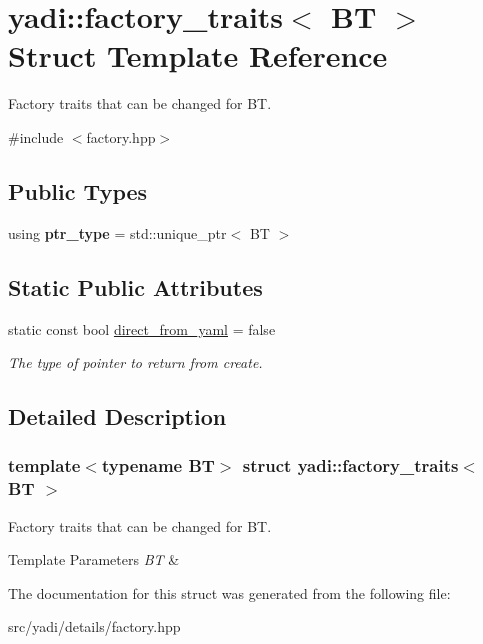 \hypertarget{structyadi_1_1factory__traits}{}\section{yadi\+:\+:factory\+\_\+traits$<$ BT $>$ Struct Template Reference}
\label{structyadi_1_1factory__traits}


Factory traits that can be changed for BT.  




{\ttfamily \#include $<$factory.\+hpp$>$}

\subsection*{Public Types}
\begin{DoxyCompactItemize}
\item 
\mbox{\label{structyadi_1_1factory__traits_a9a3b539941324b3aef58464863c76b55}} 
using {\bfseries ptr\+\_\+type} = std\+::unique\+\_\+ptr$<$ BT $>$
\end{DoxyCompactItemize}
\subsection*{Static Public Attributes}
\begin{DoxyCompactItemize}
\item 
\mbox{\label{structyadi_1_1factory__traits_af63ff1e85feaa7a1215130ac4d63e308}} 
static const bool \hyperlink{structyadi_1_1factory__traits_af63ff1e85feaa7a1215130ac4d63e308}{direct\+\_\+from\+\_\+yaml} = false
\begin{DoxyCompactList}\small\item\em The type of pointer to return from create. \end{DoxyCompactList}\end{DoxyCompactItemize}


\subsection{Detailed Description}
\subsubsection*{template$<$typename BT$>$\newline
struct yadi\+::factory\+\_\+traits$<$ B\+T $>$}

Factory traits that can be changed for BT. 


\begin{DoxyTemplParams}{Template Parameters}
{\em BT} & \\
\hline
\end{DoxyTemplParams}


The documentation for this struct was generated from the following file\+:\begin{DoxyCompactItemize}
\item 
src/yadi/details/factory.\+hpp\end{DoxyCompactItemize}
